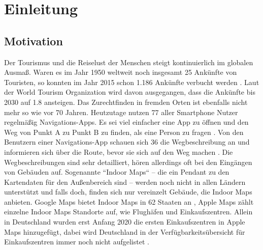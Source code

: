 \chapter{Einleitung}
\label{ch:introduction}

\section{Motivation}
Der Tourismus und die Reiselust der Menschen steigt kontinuierlich im globalen Ausmaß.
Waren es im Jahr 1950 weltweit noch insgesamt \SI{25}{\mio} Ankünfte von Touristen, so konnten im Jahr 2015 schon \SI{1.186}{\mrd} Ankünfte verbucht werden \parencite{GLA2017}.
Laut der World Tourism Organization wird davon ausgegangen, dass die Ankünfte bis 2030 auf \SI{1.8}{\mrd} ansteigen.
Das Zurechtfinden in fremden Orten ist ebenfalls nicht mehr so wie vor 70 Jahren.
Heutzutage nutzen \SI{77}{\prc} aller Smartphone Nutzer regelmäßig Navigations-Apps.
Es sei viel einfacher eine App zu öffnen und den Weg von Punkt A zu Punkt B zu finden, als eine Person zu fragen \parencite{PAN2018}.
Von den Benutzern einer Navigations-App schauen sich \SI{36}{\prc} die Wegbeschreibung an und informieren sich über die Route, bevor sie sich auf den Weg machen \parencite{PAN2018}.
Die Wegbeschreibungen sind sehr detailliert, hören allerdings oft bei den Eingängen von Gebäuden auf.
Sogenannte ``Indoor Maps`` – die ein Pendant zu den Kartendaten für den Außenbereich sind – werden noch nicht in allen Ländern unterstützt und falls doch, finden sich nur vereinzelt Gebäude, die Indoor Maps anbieten.
Google Maps bietet Indoor Maps in 62 Staaten an \parencite{GOO2020}, Apple Maps zählt einzelne Indoor Maps Standorte auf, wie Flughäfen und Einkaufszentren.
Allein in Deutschland wurden erst Anfang 2020 die ersten Einkaufszentren in Apple Maps hinzugefügt, dabei wird Deutschland in der Verfügbarkeitsübersicht für Einkaufszentren immer noch nicht aufgelistet \parencite{OES2020}.

